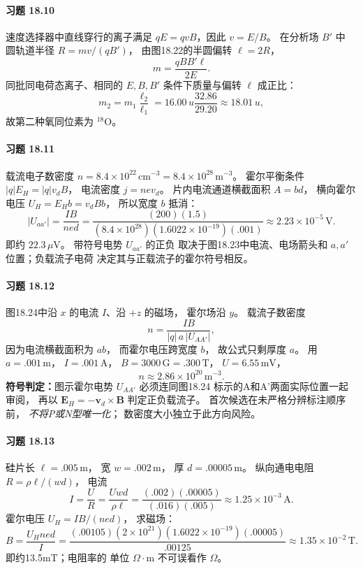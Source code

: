 \paragraph{习题 18.10}
速度选择器中直线穿行的离子满足
\(qE=qvB\)，因此
\(\boxed{v=E/B}\)。
在分析场 \(B'\) 中
圆轨道半径
\(R=mv/(qB')\)，
由图18.22的半圆偏转
\(\ell=2R\)，
\[
 \boxed{m=\frac{qBB'\ell}{2E}}.
\]
同批同电荷态离子、相同的
\(E,B,B'\) 条件下质量与偏转
\(\ell\) 成正比：
\[
 \boxed{m_2=m_1\frac{\ell_2}{\ell_1}
 =16.00\,u\frac{32.86}{29.20}
 \approx18.01\,u},
\]
故第二种氧同位素为
\(\boxed{{}^{18}\mathrm O}\)。

\paragraph{习题 18.11}
载流电子数密度
\(n=8.4\times10^{22}\,\mathrm{cm^{-3}}
 =8.4\times10^{28}\,\mathrm{m^{-3}}\)。
霍尔平衡条件
\(|q|E_H=|q|v_dB\)，
电流密度
\(j=ne v_d\)。
片内电流通道横截面积
\(A=bd\)，
横向霍尔电压
\(U_H=E_Hb=v_dBb\)，
所以宽度 \(b\) 抵消：
\[
 \boxed{|U_{aa'}|=\frac{IB}{ned}
 =\frac{(200)(1.5)}
 {(8.4\times10^{28})(1.6022\times10^{-19})(.001)}
 \approx2.23\times10^{-5}\,\mathrm V}.
\]
即约 \(22.3\,\mu\mathrm V\)。
带符号电势 \(U_{aa'}\) 的正负
取决于图18.23中电流、电场箭头和
\(a,a'\) 位置；负载流子电荷
决定其与正载流子的霍尔符号相反。

\paragraph{习题 18.12}
图18.24中沿 \(x\) 的电流
\(I\)、沿 \(+z\) 的磁场，
霍尔场沿 \(y\)。
载流子数密度
\[
 n=\frac{IB}{|q|\,a\,|U_{AA'}|},
\]
因为电流横截面积为 \(ab\)，
而霍尔电压跨宽度 \(b\)，
故公式只剩厚度 \(a\)。
用
\(a=.001\,\mathrm m\)，
\(I=.001\,\mathrm A\)，
\(B=3000\,\mathrm G=.300\,\mathrm T\)，
\(U=6.55\,\mathrm{mV}\)，
\[
 \boxed{n\approx2.86\times10^{20}\,\mathrm{m^{-3}}}.
\]
\textbf{符号判定：}图示霍尔电势
\(U_{AA'}\) 必须连同图18.24
标示的A和A'两面实际位置一起审阅，
再以
\(\boldsymbol E_H=-\boldsymbol v_d\times\boldsymbol B\)
判定正负载流子。
首次候选在未严格分辨标注顺序前，
\emph{不将P或N型唯一化}；
数密度大小独立于此方向风险。

\paragraph{习题 18.13}
硅片长 \(\ell=.005\,\mathrm m\)，
宽 \(w=.002\,\mathrm m\)，
厚 \(d=.00005\,\mathrm m\)。
纵向通电电阻
\(R=\rho\ell/(wd)\)，
电流
\[
 I=\frac U R
 =\frac{Uwd}{\rho\ell}
 =\frac{(.002)(.00005)}{(.016)(.005)}
 \approx1.25\times10^{-3}\,\mathrm A.
\]
霍尔电压
\(U_H=IB/(ned)\)，
求磁场：
\[
 \boxed{B=\frac{U_H n e d}{I}
 =\frac{(.00105)(2\times10^{21})
 (1.6022\times10^{-19})(.00005)}{.00125}
 \approx1.35\times10^{-2}\,\mathrm T}.
\]
即约13.5mT；电阻率的
单位 \(\Omega\cdot\mathrm m\)
不可误看作 \(\Omega\)。

